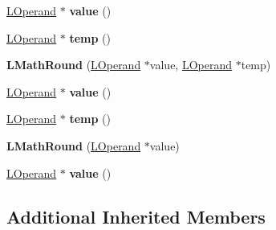 \begin{DoxyCompactItemize}
\item 
\hyperlink{classv8_1_1internal_1_1_l_operand}{L\+Operand} $\ast$ {\bfseries value} ()\hypertarget{classv8_1_1internal_1_1_l_math_round_a3f5a99b021951741ab14d46e254ff75a}{}\label{classv8_1_1internal_1_1_l_math_round_a3f5a99b021951741ab14d46e254ff75a}

\item 
\hyperlink{classv8_1_1internal_1_1_l_operand}{L\+Operand} $\ast$ {\bfseries temp} ()\hypertarget{classv8_1_1internal_1_1_l_math_round_a8452f02e9b6cee3b37aa8ad3d34260aa}{}\label{classv8_1_1internal_1_1_l_math_round_a8452f02e9b6cee3b37aa8ad3d34260aa}

\item 
{\bfseries L\+Math\+Round} (\hyperlink{classv8_1_1internal_1_1_l_operand}{L\+Operand} $\ast$value, \hyperlink{classv8_1_1internal_1_1_l_operand}{L\+Operand} $\ast$temp)\hypertarget{classv8_1_1internal_1_1_l_math_round_a43ba59dc34d6e4ee6b0059fd4bcc3dcc}{}\label{classv8_1_1internal_1_1_l_math_round_a43ba59dc34d6e4ee6b0059fd4bcc3dcc}

\item 
\hyperlink{classv8_1_1internal_1_1_l_operand}{L\+Operand} $\ast$ {\bfseries value} ()\hypertarget{classv8_1_1internal_1_1_l_math_round_a3f5a99b021951741ab14d46e254ff75a}{}\label{classv8_1_1internal_1_1_l_math_round_a3f5a99b021951741ab14d46e254ff75a}

\item 
\hyperlink{classv8_1_1internal_1_1_l_operand}{L\+Operand} $\ast$ {\bfseries temp} ()\hypertarget{classv8_1_1internal_1_1_l_math_round_a8452f02e9b6cee3b37aa8ad3d34260aa}{}\label{classv8_1_1internal_1_1_l_math_round_a8452f02e9b6cee3b37aa8ad3d34260aa}

\item 
{\bfseries L\+Math\+Round} (\hyperlink{classv8_1_1internal_1_1_l_operand}{L\+Operand} $\ast$value)\hypertarget{classv8_1_1internal_1_1_l_math_round_a68c462e1f2c09660177130a1b087b5c6}{}\label{classv8_1_1internal_1_1_l_math_round_a68c462e1f2c09660177130a1b087b5c6}

\item 
\hyperlink{classv8_1_1internal_1_1_l_operand}{L\+Operand} $\ast$ {\bfseries value} ()\hypertarget{classv8_1_1internal_1_1_l_math_round_a3f5a99b021951741ab14d46e254ff75a}{}\label{classv8_1_1internal_1_1_l_math_round_a3f5a99b021951741ab14d46e254ff75a}

\end{DoxyCompactItemize}
\subsection*{Additional Inherited Members}


